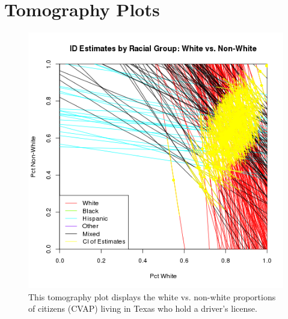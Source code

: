\documentclass[12pt]{article}
\begin{document}
\section{Tomography Plots}

\begin{figure}[htb]
\begin{centering}
\includegraphics[scale=.75]{figs/CVAP_f3_dl_white.png}
\caption{\label{tomog_white}This tomography plot displays the white vs. non-white proportions of citizens (CVAP)
living in Texas who hold a driver's license.}
\end{centering}
\end{figure}
\end{document}
